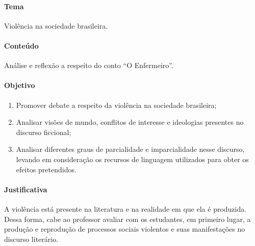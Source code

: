 \documentclass[12pt]{extarticle}
\begin{document}
\paragraph{Tema} Violência na sociedade brasileira.

\paragraph{Conteúdo} Análise e reflexão a respeito do conto ``O Enfermeiro''.

\paragraph{Objetivo}
\begin{enumerate} 
\item
Promover debate a respeito da violência na
sociedade brasileira; 
\item
Analisar visões de mundo, conflitos de
interesse e ideologias presentes no discurso ficcional; 
\item
Analisar
diferentes graus de parcialidade e imparcialidade nesse discurso,
levando em consideração os recursos de linguagem utilizados para obter
os efeitos pretendidos.
\end{enumerate}

\paragraph{Justificativa} A violência está presente na literatura e na
realidade em que ela é produzida. Dessa forma, cabe ao professor avaliar
com os estudantes, em primeiro lugar, a produção e reprodução de
processos sociais violentos e suas manifestações no discurso literário.
\end{document}
